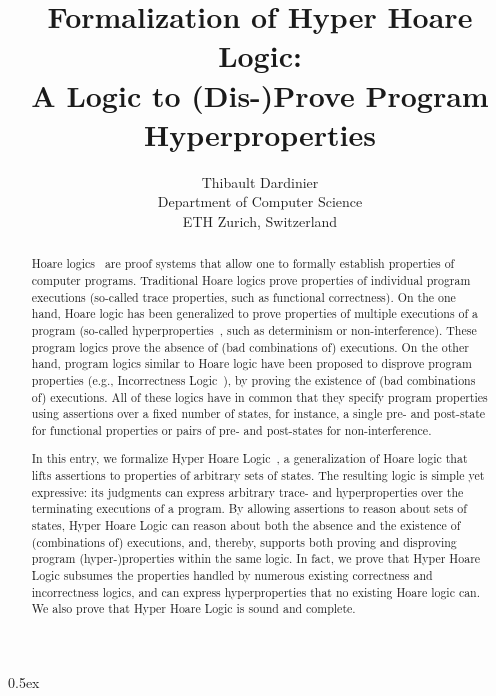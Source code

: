 \documentclass[11pt,a4paper]{article}
\begin{document}
\title{Formalization of Hyper Hoare Logic:\\A Logic to (Dis-)Prove Program Hyperproperties}
\author{Thibault Dardinier\\
Department of Computer Science\\ETH Zurich, Switzerland}

\maketitle

\begin{abstract}
	Hoare logics~\cite{FloydLogic, HoareLogic} are proof systems that allow one to formally establish properties of computer programs.
	Traditional Hoare logics prove properties of individual program executions (so-called trace properties, such as functional correctness).
	On the one hand, Hoare logic has been generalized to prove properties of multiple executions of a program (so-called hyperproperties~\cite{hyperproperties}, such as determinism or non-interference).
	These program logics prove the absence of (bad combinations of) executions.
	On the other hand, program logics similar to Hoare logic have been proposed to disprove program properties (e.g., Incorrectness Logic~\cite{IncorrectnessLogic}), by proving the existence of (bad combinations of) executions.
	All of these logics have in common that they specify program properties using assertions over a fixed number of states, for instance, a single pre- and post-state for functional properties or pairs of pre- and post-states for non-interference.

	In this entry, we formalize Hyper Hoare Logic~\cite{HyperHoareLogic}, a generalization of Hoare logic that lifts assertions to properties of arbitrary sets of states.
	The resulting logic is simple yet expressive: its judgments can express arbitrary trace- and hyperproperties over the terminating executions of a program.
	By allowing assertions to reason about sets of states, Hyper Hoare Logic can reason about both the absence and the existence of (combinations of) executions, and, thereby, supports both proving and disproving program (hyper-)properties within the same logic.
	In fact, we prove that Hyper Hoare Logic subsumes the properties handled by numerous existing correctness and incorrectness logics, and can express hyperproperties that no existing Hoare logic can.
	We also prove that Hyper Hoare Logic is sound and complete.
\end{abstract}

\clearpage

\tableofcontents

\parindent 0pt\parskip 0.5ex





\end{document}
